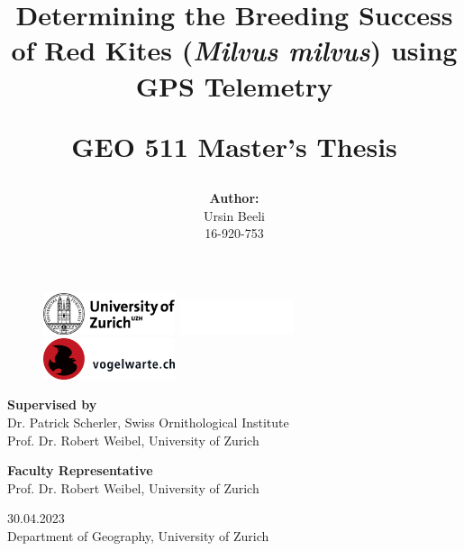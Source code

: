 \documentclass[11pt,a4paper]{article}
\begin{document}
\begin{figure}
    \includegraphics[width=0.345\textwidth]{figures/cover/uzh.png}
    \includegraphics[width=0.3\textwidth]{figures/cover/blank.png}
    \includegraphics[width=0.345\textwidth]{figures/cover/vogelwarte.jpg}
\end{figure}

\title {Determining the Breeding Success of Red Kites (\textit{Milvus milvus}) using GPS Telemetry

\vspace{2\baselineskip}

\large GEO 511 Master’s Thesis

\vspace{2\baselineskip}
}

\author{\textbf{Author:}\\Ursin Beeli\\16-920-753
}
\date{}
\renewcommand*\contentsname{Contents}
\maketitle

\vspace{4\baselineskip}

\noindent\textbf{Supervised by\\}
Dr. Patrick Scherler, Swiss Ornithological Institute\\Prof. Dr. Robert Weibel, University of Zurich

\vspace{2\baselineskip}

\noindent\textbf{Faculty Representative\\}
Prof. Dr. Robert Weibel, University of Zurich

\vspace{8\baselineskip}

\begin{center}
30.04.2023\\Department of Geography, University of Zurich
\end{center}
\end{document}
